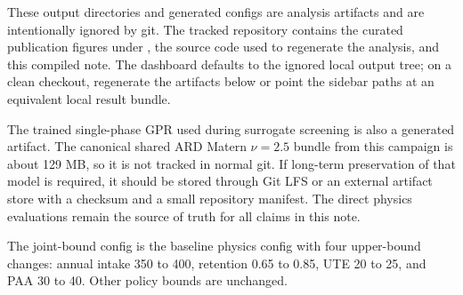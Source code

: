 \documentclass[10pt]{article}
\begin{document}
These output directories and generated configs are analysis artifacts and are
intentionally ignored by git. The tracked repository contains the curated
publication figures under , the source code used
to regenerate the analysis, and this compiled note. The dashboard defaults to
the ignored local output tree; on a clean checkout, regenerate the artifacts
below or point the sidebar paths at an equivalent local result bundle.

The trained single-phase GPR used during surrogate screening is also a generated
artifact. The canonical shared ARD Matern $\nu=2.5$ bundle from this campaign is
about 129 MB, so it is not tracked in normal git. If long-term preservation of
that model is required, it should be stored through Git LFS or an external
artifact store with a checksum and a small repository manifest. The direct
physics evaluations remain the source of truth for all claims in this note.

The joint-bound config is the baseline physics config with four upper-bound
changes: annual intake 350 to 400, retention 0.65 to 0.85, UTE 20 to 25, and
PAA 30 to 40. Other policy bounds are unchanged.
\end{document}

